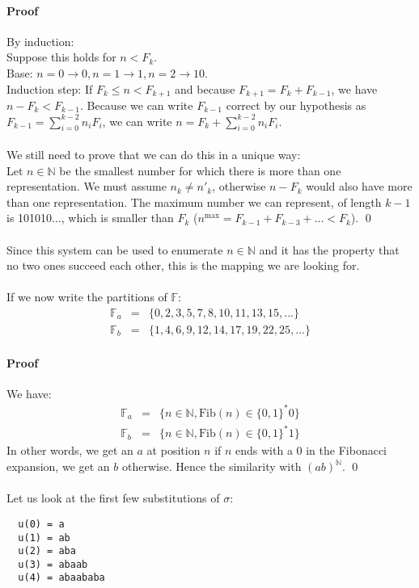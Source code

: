 \documentclass{article}
\begin{document}
\paragraph{Proof} By induction:\\
Suppose this holds for $n < F_k$.\\
Base: $n = 0 \rightarrow 0, n = 1 \rightarrow 1, n = 2 \rightarrow 10$.\\
Induction step: If $F_k \le n < F_{k + 1}$ and because
$F_{k + 1} = F_k + F_{k - 1}$, we have $n - F_k < F_{k - 1}$. Because we
can write $F_{k - 1}$ correct by our hypothesis as
$F_{k - 1} = \sum_{i = 0}^{k - 2} n_i F_i$, we can write
$n = F_k + \sum_{i = 0}^{k - 2} n_i F_i$.\\
\\
We still need to prove that we can do this in a unique way:\\
Let $n \in \mathbb{N}$ be the smallest number for which there is more than one
representation. We must assume $n_k \ne n'_k$, otherwise $n - F_k$ would also
have more than one representation. The maximum number we can represent, of
length $k - 1$ is 101010..., which is smaller than $F_k$
($n^{\mathrm{max}} = F_{k - 1} + F_{k - 3} + ... < F_k$). \qed\\
\\
Since this system can be used to enumerate $n \in \mathbb{N}$ and it has the
property that no two ones succeed each other, this is the mapping we are
looking for.\\
\\
If we now write the partitions of $\mathbb{F}$:
\begin{eqnarray*}
  \mathbb{F}_a &=& \{0, 2, 3, 5, 7, 8, 10, 11, 13, 15, ...\}\\
  \mathbb{F}_b &=& \{1, 4, 6, 9, 12, 14, 17, 19, 22, 25, ...\}
\end{eqnarray*}

\paragraph{Proof} We have:
\begin{eqnarray*}
  \mathbb{F}_a &=& \{n \in \mathbb{N}, \mathrm{Fib}(n) \in \{0, 1\}^* 0\}\\
  \mathbb{F}_b &=& \{n \in \mathbb{N}, \mathrm{Fib}(n) \in \{0, 1\}^* 1\}
\end{eqnarray*}
In other words, we get an $a$ at position $n$ if $n$ ends with a 0 in the
Fibonacci expansion, we get an $b$ otherwise. Hence the similarity with
$(ab)^{\mathbb{N}}$. \qed\\
\\
Let us look at the first few substitutions of $\sigma$:
\begin{verbatim}
  u(0) = a
  u(1) = ab
  u(2) = aba
  u(3) = abaab
  u(4) = abaababa
\end{verbatim}
\end{document}
